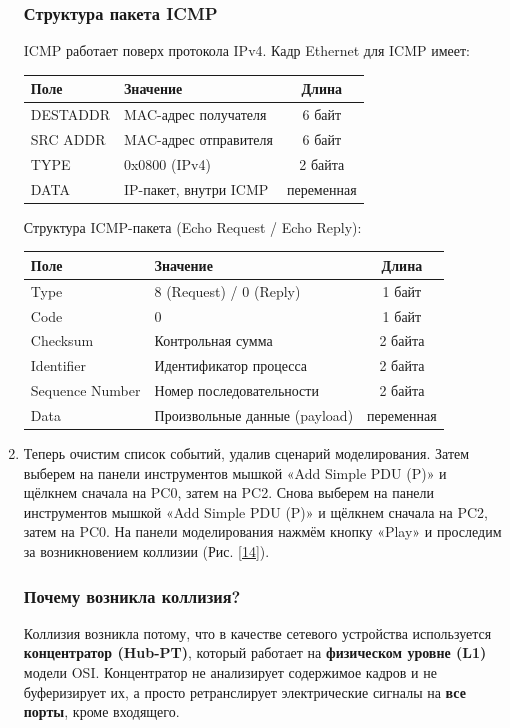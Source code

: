 \begin{enumerate}
\subsubsection*{Структура пакета ICMP}
ICMP работает поверх протокола IPv4. Кадр Ethernet для ICMP имеет:
\begin{center}
\begin{tabular}{|l|l|c|}
\hline
\textbf{Поле} & \textbf{Значение} & \textbf{Длина} \\
\hline
DESTADDR & MAC-адрес получателя & 6 байт \\
SRC ADDR & MAC-адрес отправителя & 6 байт \\
TYPE & 0x0800 (IPv4) & 2 байта \\
DATA & IP-пакет, внутри ICMP & переменная \\
\hline
\end{tabular}
\end{center}

Структура ICMP-пакета (Echo Request / Echo Reply):
\begin{center}
\begin{tabular}{|l|l|c|}
\hline
\textbf{Поле} & \textbf{Значение} & \textbf{Длина} \\
\hline
Type & 8 (Request) / 0 (Reply) & 1 байт \\
Code & 0 & 1 байт \\
Checksum & Контрольная сумма & 2 байта \\
Identifier & Идентификатор процесса & 2 байта \\
Sequence Number & Номер последовательности & 2 байта \\
Data & Произвольные данные (payload) & переменная \\
\hline
\end{tabular}
\end{center}

\item Теперь очистим список событий, удалив сценарий моделирования. Затем выберем на панели инструментов мышкой «Add Simple PDU (P)» и щёлкнем сначала на PC0, затем на PC2. Снова выберем на панели инструментов мышкой «Add Simple PDU (P)» и щёлкнем сначала на PC2, затем на PC0. На панели моделирования нажмём кнопку «Play» и проследим за возникновением коллизии (Рис. \ref{14}). 

\subsubsection*{Почему возникла коллизия?}
Коллизия возникла потому, что в качестве сетевого устройства используется \textbf{концентратор (Hub-PT)}, который работает на \textbf{физическом уровне (L1)} модели OSI. Концентратор не анализирует содержимое кадров и не буферизирует их, а просто ретранслирует электрические сигналы на \textbf{все порты}, кроме входящего.


\end{enumerate}
